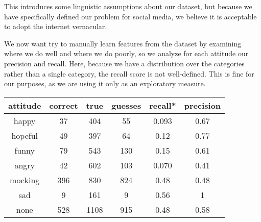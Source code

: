 \documentclass[11pt]{article}
\begin{document}
\def\ngramlablels{{"None", "Capitalization", "Dialogue", "Punctuation", "Emoticons", "Negation", "Sentence-Sentiment", "Cursing", "Place Holder","Total"}}
\begin{center}
\end{center}

This introduces some linguistic assumptions about our dataset, but because we have specifically defined our problem for social media, we believe it is acceptable to adopt the internet vernacular.

We now want try to manually learn features from the dataset by examining where we do well and where we do poorly, so we analyze for each attitude our precision and recall. Here, because we have a distribution over the categories rather than a single category, the recall score is not well-defined. This is fine for our purposes, as we are using it only as an exploratory measure.

\begin{center}

\begin{tabular}{|c|c|c|c|c|c|}
\hline 
attitude & correct & true & guesses & recall{*} & precision\tabularnewline
\hline 
\hline 
happy & 37 & 404 & 55 & 0.093 & 0.67\tabularnewline
\hline 
hopeful & 49 & 397 & 64 & 0.12 & 0.77\tabularnewline
\hline 
funny & 79 & 543 & 130 & 0.15 & 0.61\tabularnewline
\hline 
angry & 42 & 602 & 103 & 0.070 & 0.41\tabularnewline
\hline 
mocking & 396 & 830 & 824 & 0.48 & 0.48\tabularnewline
\hline 
sad & 9 & 161 & 9 & 0.56 & 1\tabularnewline
\hline 
none & 528 & 1108 & 915 & 0.48 & 0.58\tabularnewline
\hline 
\end{tabular}
\end{center}
\end{document}
